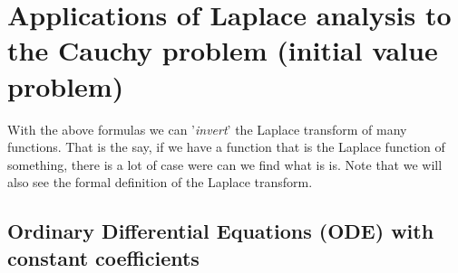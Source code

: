 \section{Applications of Laplace analysis to the Cauchy problem (initial value problem)}

With the above formulas we can '\textit{invert}' the Laplace transform of many functions. That is the say, if we have a function that is the Laplace function of something, there is a lot of case were can we find what is  is. Note that we will also see the formal definition of the Laplace transform.


\subsection{Ordinary Differential Equations (ODE) with constant coefficients}

